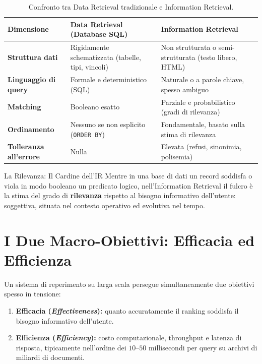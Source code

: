 \begin{table}[htbp]
\centering
\small
\begin{tabularx}{\textwidth}{>{\raggedright\bfseries\arraybackslash}p{3.6cm} >{\raggedright\arraybackslash}X >{\raggedright\arraybackslash}X}
\toprule
\normalfont\textbf{Dimensione} & \textbf{Data Retrieval (Database SQL)} & \textbf{Information Retrieval} \\
\midrule
Struttura dati & Rigidamente schematizzata (tabelle, tipi, vincoli) & Non strutturata o semi-strutturata (testo libero, HTML) \\
Linguaggio di query & Formale e deterministico (SQL) & Naturale o a parole chiave, spesso ambiguo \\
Matching & Booleano esatto & Parziale e probabilistico (gradi di rilevanza) \\
Ordinamento & Nessuno se non esplicito (\texttt{ORDER BY}) & Fondamentale, basato sulla stima di rilevanza \\
Tolleranza all'errore & Nulla & Elevata (refusi, sinonimia, polisemia) \\
\bottomrule
\end{tabularx}
\caption{Confronto tra Data Retrieval tradizionale e Information Retrieval.}
\label{tab:ir-vs-dr}
\end{table}

\begin{alertblock}{La Rilevanza: Il Cardine dell'IR}
Mentre in una base di dati un record soddisfa o viola in modo booleano un predicato logico, nell'Information Retrieval il fulcro \`e la stima del grado di \textbf{rilevanza} rispetto al bisogno informativo dell'utente: soggettiva, situata nel contesto operativo ed evolutiva nel tempo.
\end{alertblock}

\FloatBarrier
\section{I Due Macro-Obiettivi: Efficacia ed Efficienza}

Un sistema di reperimento su larga scala persegue simultaneamente due obiettivi spesso in tensione:
\begin{enumerate}
    \item \textbf{Efficacia (\textit{Effectiveness}):} quanto accuratamente il ranking soddisfa il bisogno informativo dell'utente.
    \item \textbf{Efficienza (\textit{Efficiency}):} costo computazionale, throughput e latenza di risposta, tipicamente nell'ordine dei $10$--$50$ millisecondi per query su archivi di miliardi di documenti.
\end{enumerate}

